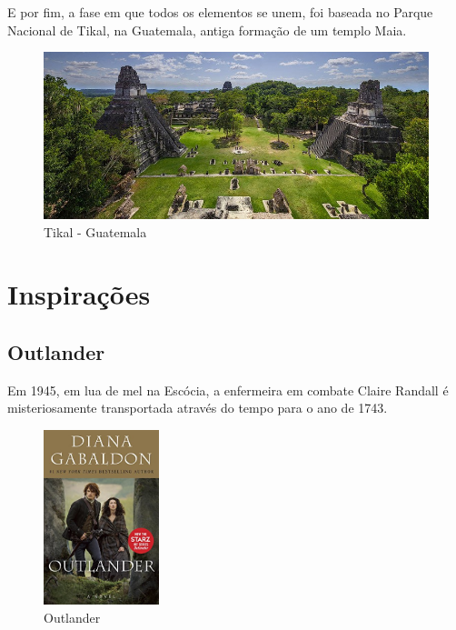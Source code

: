 E por fim, a fase em que todos os elementos se unem, foi baseada no Parque Nacional de Tikal, na Guatemala, antiga formação de um templo Maia.

\clearpage

\begin{figure}[htb]
    \caption{\label{fig_mundoHub}Tikal - Guatemala}
    \begin{center}
        \includegraphics[width=\textwidth]{imagens/tikal.jpg}
    \end{center}
\end{figure}


\section{Inspirações}


\subsection{Outlander}

Em 1945, em lua de mel na Escócia, a enfermeira em combate Claire Randall é
misteriosamente transportada através do tempo para o ano de 1743.

\begin{figure}[!htb] \caption{\label{Outlander}Outlander} \begin{center}
\includegraphics[width=0.3\textwidth]{imagens/outlander.jpg} \end{center}
 \end{figure}

